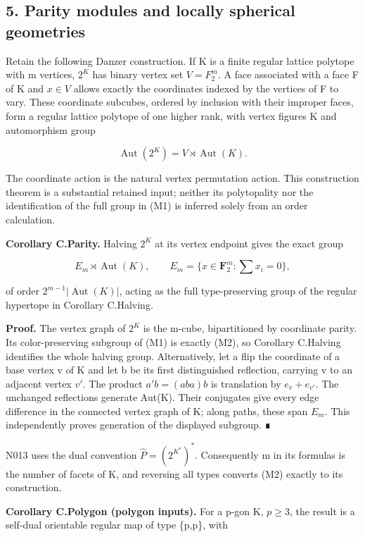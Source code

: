 \documentclass[
  11pt,
  a4paper,
]{article}
\begin{document}
\subsection{5. Parity modules and locally spherical
geometries}\label{parity-modules-and-locally-spherical-geometries}

Retain the following Danzer construction. If K is a finite regular
lattice polytope with m vertices, \(2^K\) has binary vertex set
\(V=F_{2}^m\). A face associated with a face F of K and \(x\in V\)
allows exactly the coordinates indexed by the vertices of F to vary.
These coordinate subcubes, ordered by inclusion with their improper
faces, form a regular lattice polytope of one higher rank, with vertex
figures K and automorphism group

\[
\operatorname{Aut}(2^K)=V\rtimes\operatorname{Aut}(K).
\tag{M1}
\]

The coordinate action is the natural vertex permutation action. This
construction theorem is a substantial retained input; neither its
polytopality nor the identification of the full group in (M1) is
inferred solely from an order calculation.

\textbf{Corollary C.Parity.} Halving \(2^K\) at its vertex endpoint
gives the exact group

\[
E_m\rtimes\operatorname{Aut}(K),\qquad
E_m=\{x\in\mathbf F_2^m:\sum x_i=0\},
\tag{M2}
\]

of order \(2^{m-1}|\operatorname{Aut}(K)|\), acting as the full
type-preserving group of the regular hypertope in Corollary C.Halving.

\textbf{Proof.} The vertex graph of \(2^K\) is the m-cube, bipartitioned
by coordinate parity. Its color-preserving subgroup of (M1) is exactly
(M2), so Corollary C.Halving identifies the whole halving group.
Alternatively, let a flip the coordinate of a base vertex v of K and let
b be its first distinguished reflection, carrying v to an adjacent
vertex \(v'\). The product \(a'b=(aba)b\) is translation by
\(e_v+e_{v'}\). The unchanged reflections generate Aut(K). Their
conjugates give every edge difference in the connected vertex graph of
K; along paths, these span \(E_m\). This independently proves generation
of the displayed subgroup. ∎

N013 uses the dual convention \(\widehat P=(2^{K^*})^*\). Consequently m
in its formulas is the number of facets of K, and reversing all types
converts (M2) exactly to its construction.

\textbf{Corollary C.Polygon (polygon inputs).} For a p-gon K,
\(p\ge 3\), the result is a self-dual orientable regular map of type
\{p,p\}, with
\end{document}
